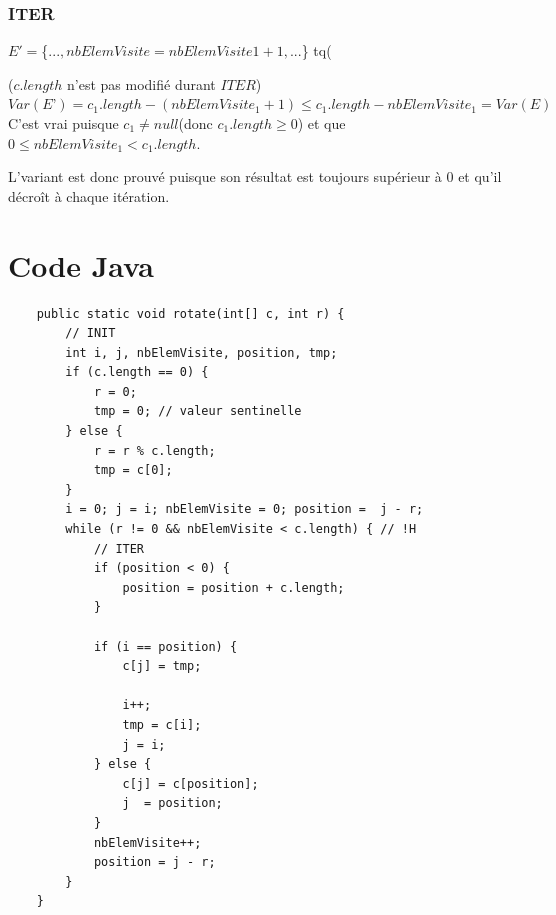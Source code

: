 	\subsubsection{ITER}	

	\begin{description}
		\item[$E' = $\{$..., nbElemVisite=nbElemVisite1+1,...$\} tq(] 
	\end{description}	



	($c.length$ n’est pas modifié durant $ITER$)
	$Var(E’)=c_1.length-(nbElemVisite_1+1) \leq c_1.length-nbElemVisite_1=Var(E)$
	C’est vrai puisque $c_1 \neq null$(donc $c_1.length \geq 0$) 
	et que $0 \leq nbElemVisite_1 < c_1.length$.
	
	L’variant est donc prouvé puisque son résultat est toujours supérieur à $0$ et qu’il décroît à chaque itération.


	\section{Code Java}
	
	\begin{lstlisting}
	public static void rotate(int[] c, int r) {
		// INIT
		int i, j, nbElemVisite, position, tmp;
		if (c.length == 0) {
			r = 0;
			tmp = 0; // valeur sentinelle
		} else {
			r = r % c.length;
			tmp = c[0];
		}
		i = 0; j = i; nbElemVisite = 0; position =  j - r;
		while (r != 0 && nbElemVisite < c.length) { // !H
			// ITER
			if (position < 0) {
				position = position + c.length;
			}
			
			if (i == position) {
				c[j] = tmp;
			
				i++;
				tmp = c[i];
				j = i;
			} else {
				c[j] = c[position];
				j  = position;
			}
			nbElemVisite++;
			position = j - r;
		}
	}
	\end{lstlisting}







				
